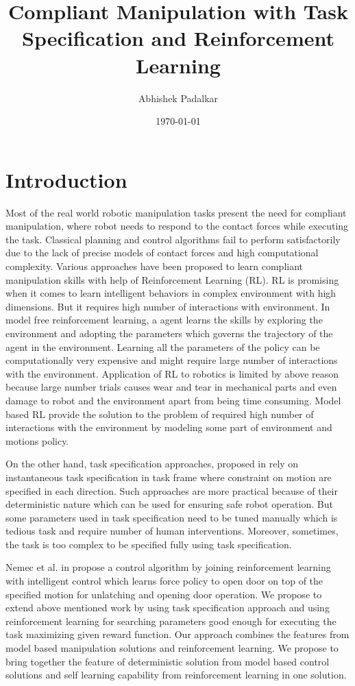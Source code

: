 \documentclass[thesis]{mas_proposal}
\title{Compliant Manipulation with Task Specification and Reinforcement Learning}
\author{Abhishek Padalkar}
\date{\today}
\begin{document}
\maketitle

\pagestyle{plain}

\chapter{Introduction}
Most of the real world robotic manipulation tasks present the need for compliant manipulation, where robot needs to respond to the contact forces while executing the task. Classical planning and control algorithms fail to perform satisfactorily due to the lack of precise models of contact forces and high computational complexity. Various approaches have been proposed to learn compliant manipulation skills with help of Reinforcement Learning (RL). RL is promising when it comes to learn intelligent behaviors in complex environment with high dimensions. But it requires high number of interactions with environment. In model free reinforcement learning, a agent learns the skills by exploring the environment and adopting the parameters which governs the trajectory of the agent in the environment. Learning all the parameters of the policy can be computationally very expensive and might require large number of interactions with the environment. Application of RL to robotics is limited by above reason because large number trials causes wear and tear in mechanical parts and even damage to robot and the environment apart from being time consuming. Model based RL provide the solution to the problem of required high number of interactions with the environment by modeling some part of environment and motions policy. 

On the other hand, task specification approaches, proposed in \cite{leidner2017cognitive,mason1981compliance,bruyninckx1996specification} rely on instantaneous task specification in task frame where constraint on motion are specified in each direction. Such approaches are more practical because of their deterministic nature which can be used for ensuring safe robot operation. But some parameters used in task specification need to be tuned manually which is tedious task and require number of human interventions. Moreover, sometimes, the task is too complex to be specified fully using task specification. 

Nemec et al. in \cite{nemec2017door} propose a control algorithm by joining reinforcement learning with intelligent control which learns force policy to open door on top of the specified motion for unlatching and opening door operation.
We propose to extend above mentioned work by using task specification approach and using reinforcement learning for searching parameters good enough for executing the task maximizing given reward function. Our approach combines the features from model based manipulation solutions and reinforcement learning. We propose to bring together the feature of deterministic solution from model based control solutions and self learning capability from reinforcement learning in one solution.  
\end{document}
